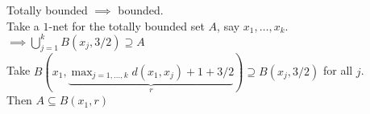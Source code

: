\prop Totally bounded $\implies$ bounded. \\
\pf Take a $1$-net for the totally bounded set $A$, say $x_1,\dotsc,x_k$. \\
$\implies \bigcup_{j=1}^k B(x_j,3/2) \supseteq A$ \\
Take $B(x_1,\underbrace{\max_{j=1,\dotsc,k} d(x_1,x_j)+1+3/2}_r) \supseteq B(x_j,3/2)$ for all $j$. \\
Then $A\subseteq B(x_1,r)$
